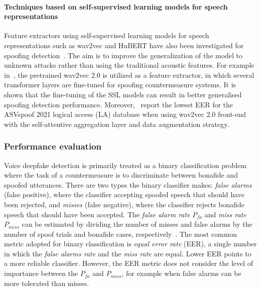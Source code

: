 \paragraph{Techniques based on self-supervised learning models for speech representations}

Feature extractors using self-supervised learning models for speech representations such as wav2vec and HuBERT have also been investigated for spoofing detection~\cite{xie2021, lantingli2023, kang2024}. The aim is to improve the generalization of the model to unknown attacks rather than using the traditional acoustic features. For example in~\cite{kang2024}, the pretrained wav2vec 2.0 is utilized as a feature extractor, in which several transformer layers are fine-tuned for spoofing countermeasure systems. It is shown that the fine-tuning of the SSL models can result in better generalised spoofing detection performance. Moreover,~\cite{hemlata2023} report the lowest EER for the ASVspoof 2021 logical access (LA) database when using wav2vec 2.0 front-end with the self-attentive aggregation layer and data augmentation strategy.   


%
\subsubsection{Performance evaluation}

Voice deepfake detection is primarily treated as a binary classification problem where the task of a countermeasure is to discriminate between bonafide and spoofed utterances. There are two types the binary classifier makes: \textit{false alarms} (false positive), where the classifier accepting spoofed speech that should have been rejected, and \textit{misses} (false negative), where the classifier rejects bonafide speech that should have been accepted. The \textit{false alarm rate} $P_{fa}$ and \textit{miss rate} $P_{miss}$ can be estimated by dividing the number of misses and false alarms by the number of spoof trials and bonafide cases, respectively~\cite{bonastre2021}. 
The most common metric adopted for binary classification is \textit{equal error rate} (EER), a single number in which the \textit{false alarms rate} and the \textit{miss rate} are equal. Lower EER points to a more reliable classifier. However, the EER metric does not consider the level of importance between the $P_{fa}$ and $P_{miss}$, for example when false alarms can be more tolerated than misses.

